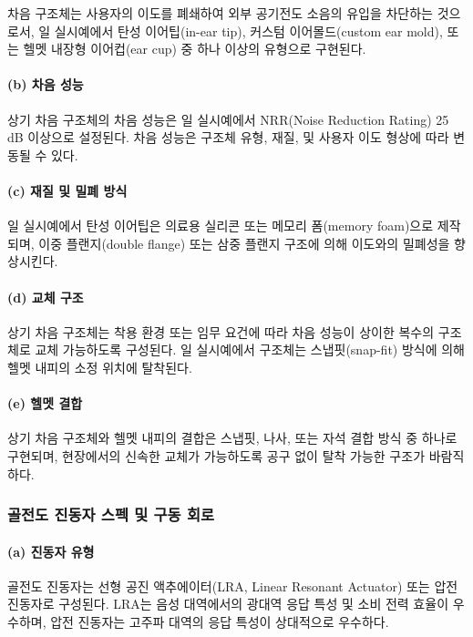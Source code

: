 \documentclass{article}
\begin{document}
차음 구조체는 사용자의 이도를 폐쇄하여 외부 공기전도 소음의 유입을 차단하는 것으로서, 일 실시예에서 탄성 이어팁(in-ear tip), 커스텀 이어몰드(custom ear mold), 또는 헬멧 내장형 이어컵(ear cup) 중 하나 이상의 유형으로 구현된다.

\paragraph{(b) 차음 성능}

상기 차음 구조체의 차음 성능은 일 실시예에서 NRR(Noise Reduction Rating) 25\,dB 이상으로 설정된다. 차음 성능은 구조체 유형, 재질, 및 사용자 이도 형상에 따라 변동될 수 있다.

\paragraph{(c) 재질 및 밀폐 방식}

일 실시예에서 탄성 이어팁은 의료용 실리콘 또는 메모리 폼(memory foam)으로 제작되며, 이중 플랜지(double flange) 또는 삼중 플랜지 구조에 의해 이도와의 밀폐성을 향상시킨다.

\paragraph{(d) 교체 구조}

상기 차음 구조체는 착용 환경 또는 임무 요건에 따라 차음 성능이 상이한 복수의 구조체로 교체 가능하도록 구성된다. 일 실시예에서 구조체는 스냅핏(snap-fit) 방식에 의해 헬멧 내피의 소정 위치에 탈착된다.

\paragraph{(e) 헬멧 결합}

상기 차음 구조체와 헬멧 내피의 결합은 스냅핏, 나사, 또는 자석 결합 방식 중 하나로 구현되며, 현장에서의 신속한 교체가 가능하도록 공구 없이 탈착 가능한 구조가 바람직하다.

\subsubsection{골전도 진동자 스펙 및 구동 회로}

\paragraph{(a) 진동자 유형}

골전도 진동자는 선형 공진 액추에이터(LRA, Linear Resonant Actuator) 또는 압전 진동자로 구성된다. LRA는 음성 대역에서의 광대역 응답 특성 및 소비 전력 효율이 우수하며, 압전 진동자는 고주파 대역의 응답 특성이 상대적으로 우수하다.
\end{document}
